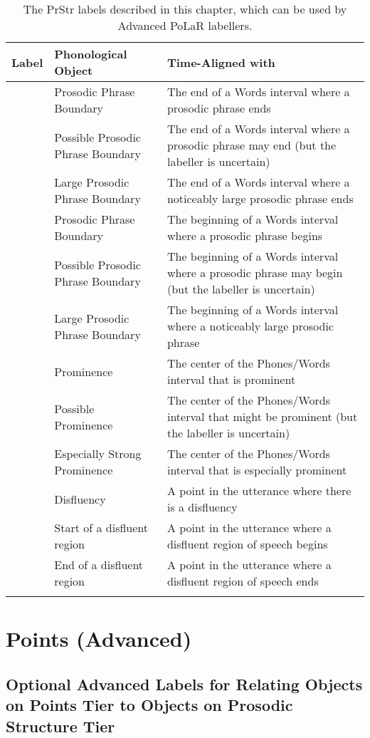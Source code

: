 \begin{longtable}{cp{.3\linewidth}p{.45\linewidth}}
	\toprule
	\textbf{Label} & \textbf{Phonological Object} & \textbf{Time-Aligned with} \tabularnewline
	\midrule
	\endhead
	\rowcolor{green}
	\textlabel{]} & Prosodic Phrase Boundary & The end of a Words interval where a prosodic phrase ends \tabularnewline
	\textlabel{?]} & Possible Prosodic Phrase Boundary & The end of a Words interval where a prosodic phrase may end (but the labeller is uncertain) \tabularnewline
	\textlabel{]]} & Large Prosodic Phrase Boundary & The end of a Words interval where a noticeably large prosodic phrase ends \tabularnewline
	\textlabel{[} & Prosodic Phrase Boundary & The beginning of a Words interval where a prosodic phrase begins \tabularnewline
	\textlabel{?[} & Possible Prosodic Phrase Boundary & The beginning of a Words interval where a prosodic phrase may begin (but the labeller is uncertain) \tabularnewline
	\textlabel{[[} & Large Prosodic Phrase Boundary & The beginning of a Words interval where a noticeably large prosodic phrase \tabularnewline
	\hline
	\rowcolor{green}
	\textlabel{*} & Prominence & The center of the Phones/Words interval that is prominent\tabularnewline
	\textlabel{?*} & Possible Prominence & The center of the Phones/Words interval that might be prominent (but the labeller is uncertain) \tabularnewline
	\textlabel{**} & Especially Strong Prominence & The center of the Phones/Words interval that is especially prominent \tabularnewline
	\hline
	\textlabel{d} & Disfluency & A point in the utterance where there is a disfluency\tabularnewline
	\textlabel{\{d} & Start of a disfluent region & A point in the utterance where a disfluent region of speech begins\tabularnewline
	\textlabel{d\}} & End of a disfluent region & A point in the utterance where a disfluent region of speech ends\tabularnewline
	\bottomrule
	\caption{The PrStr labels described in this chapter, which can be used by Advanced PoLaR labellers.}
\end{longtable}


\section{Points (Advanced)}\label{sec:points-advanced}

\subsection{Optional Advanced Labels for Relating Objects on Points Tier to Objects on Prosodic Structure Tier}\label{sec:optional-advanced-labels-for-relating-points-tier-objects-to-prosodic-structure-tier-objects}

